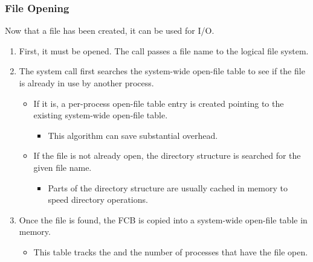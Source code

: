 \subsubsection{File Opening}\label{subsubsec:File_Opening}
Now that a file has been created, it can be used for I/O.
\begin{enumerate}[noitemsep]
\item First, it must be opened. The  call passes a file name to the logical file system.
\item The  system call first searches the system-wide open-file table to see if the file is already in use by another process.
  \begin{itemize}[noitemsep]
  \item If it is, a per-process open-file table entry is created pointing to the existing system-wide open-file table.
    \begin{itemize}[noitemsep]
    \item This algorithm can save substantial overhead.
    \end{itemize}
  \item If the file is not already open, the directory structure is searched for the given file name.
    \begin{itemize}[noitemsep]
    \item Parts of the directory structure are usually cached in memory to speed directory operations.
    \end{itemize}
  \end{itemize}

\item Once the file is found, the FCB is copied into a system-wide open-file table in memory.
  \begin{itemize}[noitemsep]
  \item This table tracks the  and the number of processes that have the file open.
  \end{itemize}


\end{enumerate}
